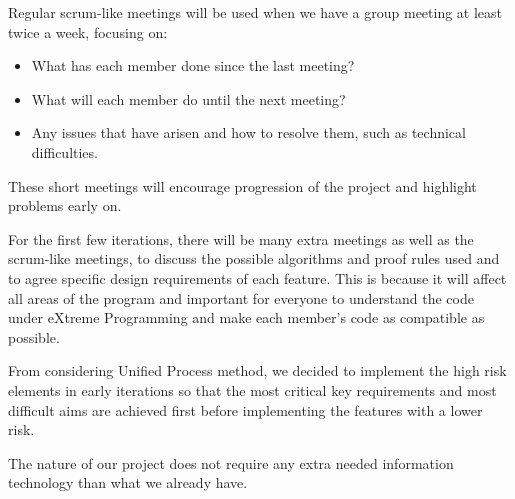 Regular scrum-like meetings will be used when we have a group meeting at least twice a week, focusing on:

\begin{itemize}
\item What has each member done since the last meeting?
\item What will each member do until the next meeting?
\item Any issues that have arisen and how to resolve them, such as technical difficulties.
\end{itemize}

These short meetings will encourage progression of the project and highlight problems early on.

For the first few iterations, there will be many extra meetings as well as the scrum-like meetings, to discuss the possible algorithms and proof rules used and to agree specific design requirements of each feature. This is because it will affect all areas of the program and important for everyone to understand the code under eXtreme Programming and make each member's code as compatible as possible.

From considering Unified Process method, we decided to implement the high risk elements in early iterations so that the most critical key requirements and most difficult aims are achieved first before implementing the features with a lower risk.

The nature of our project does not require any extra needed information technology than what we already have.